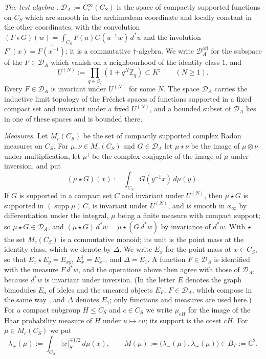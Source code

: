 \documentclass[11pt]{amsart}
\theoremstyle{definition}
\newcommand{\C}{\mathbb C}
\newcommand{\Z}{\mathbb Z}
\newcommand{\supp}{\operatorname{supp}}
\newcommand{\Knat}{K^{\natural}}
\newcommand{\DA}{\mathcal D_A}
\newcommand{\Doff}{\mathcal D_A^{\mathrm{off}}}
\begin{document}
\medskip
\emph{The test algebra} \cite[Definition~2.4]{Companion}. $\DA:=C_c^\infty(C_S)$
is the space of compactly supported functions on $C_S$ which are smooth in the
archimedean coordinate and locally constant in the other coordinates, with the
convolution $(F\star G)(w)=\int_{C_S}F(u)G(u^{-1}w)\,d^*u$ and the involution
$F^\dagger(x)=\overline{F(x^{-1})}$; it is a commutative $\dagger$-algebra. We
write $\Doff$ for the subspace of the $F\in\DA$ which vanish on a neighbourhood
of the identity class $1$, and
\[
  U^{(N)}:=\prod_{q\in S_f}(1+q^N\Z_q)\subset\Knat\qquad(N\ge1).
\]
Every $F\in\DA$ is invariant under $U^{(N)}$ for some $N$. The space $\DA$ carries
the inductive limit topology of the Fr\'echet spaces of functions supported in
a fixed compact set and invariant under a fixed $U^{(N)}$, and a bounded subset of
$\DA$ lies in one of these spaces and is bounded there.

\medskip
\emph{Measures.} Let $M_c(C_S)$ be the set of compactly supported complex
Radon measures on $C_S$. For $\mu,\nu\in M_c(C_S)$ and $G\in\DA$ let
$\mu\star\nu$ be the image of $\mu\otimes\nu$ under multiplication, let
$\mu^\dagger$ be the complex conjugate of the image of $\mu$ under inversion,
and put
\[
  (\mu\star G)(x):=\int_{C_S}G(y^{-1}x)\,d\mu(y) .
\]
If $G$ is supported in a compact set $C$ and invariant under $U^{(N)}$, then
$\mu\star G$ is supported in $(\supp\mu)\,C$, is invariant under $U^{(N)}$,
and is smooth in $x_\infty$ by differentiation under the integral, $\mu$
being a finite measure with compact support; so $\mu\star G\in\DA$, and
$(\mu\star G)\,d^*w=\mu\star(G\,d^*w)$ by invariance of $d^*w$. With $\star$ the set $M_c(C_S)$ is a commutative monoid; its unit is the
point mass at the identity class, which we denote by $\Delta$. We write
$E_x$ for the point mass at $x\in C_S$, so that $E_x\star E_y=E_{xy}$,
$E_x^\dagger=E_{x^{-1}}$ and $\Delta=E_1$. A function $F\in\DA$ is identified
with the measure $F\,d^*w$, and the operations above then agree with those of
$\DA$, because $d^*w$ is invariant under inversion. (In
\cite[Section~3]{Companion} the letter $E$ denotes the graph bimodules $E_a$
of ideles and the smeared objects $E_F$, $F\in\DA$, which compose in the same
way \cite[(11), Corollary~3.4]{Companion}, and $\Delta$ denotes $E_1$; only
functions and measures are used here.) For a compact subgroup $H\le C_S$ and $c\in C_S$ we write $\mu_{cH}$
for the image of the Haar probability measure of $H$ under $u\mapsto cu$; its
support is the coset $cH$. For $\mu\in M_c(C_S)$ we put
\[
  \lambda_\mp(\mu):=\int_{C_S}|x|_S^{\mp1/2}\,d\mu(x),\qquad
  M(\mu):=\bigl(\lambda_-(\mu),\lambda_+(\mu)\bigr)\in B_T:=\C^2 .
\]
\end{document}
